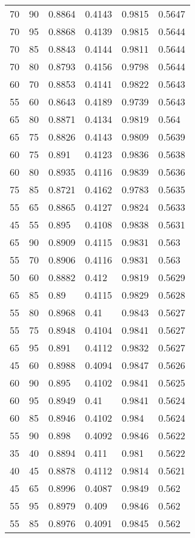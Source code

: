 \begin{center}
\begin{longtable}{|l|l|l|l|l|l|}
70 & 90 & 0.8864 & 0.4143 & 0.9815 & 0.5647 \\
70 & 95 & 0.8868 & 0.4139 & 0.9815 & 0.5644 \\
70 & 85 & 0.8843 & 0.4144 & 0.9811 & 0.5644 \\
70 & 80 & 0.8793 & 0.4156 & 0.9798 & 0.5644 \\
60 & 70 & 0.8853 & 0.4141 & 0.9822 & 0.5643 \\
55 & 60 & 0.8643 & 0.4189 & 0.9739 & 0.5643 \\
65 & 80 & 0.8871 & 0.4134 & 0.9819 & 0.564  \\
65 & 75 & 0.8826 & 0.4143 & 0.9809 & 0.5639 \\
60 & 75 & 0.891  & 0.4123 & 0.9836 & 0.5638 \\
60 & 80 & 0.8935 & 0.4116 & 0.9839 & 0.5636 \\
75 & 85 & 0.8721 & 0.4162 & 0.9783 & 0.5635 \\
55 & 65 & 0.8865 & 0.4127 & 0.9824 & 0.5633 \\
45 & 55 & 0.895  & 0.4108 & 0.9838 & 0.5631 \\
65 & 90 & 0.8909 & 0.4115 & 0.9831 & 0.563  \\
55 & 70 & 0.8906 & 0.4116 & 0.9831 & 0.563  \\
50 & 60 & 0.8882 & 0.412  & 0.9819 & 0.5629 \\
65 & 85 & 0.89   & 0.4115 & 0.9829 & 0.5628 \\
55 & 80 & 0.8968 & 0.41   & 0.9843 & 0.5627 \\
55 & 75 & 0.8948 & 0.4104 & 0.9841 & 0.5627 \\
65 & 95 & 0.891  & 0.4112 & 0.9832 & 0.5627 \\
45 & 60 & 0.8988 & 0.4094 & 0.9847 & 0.5626 \\
60 & 90 & 0.895  & 0.4102 & 0.9841 & 0.5625 \\
60 & 95 & 0.8949 & 0.41   & 0.9841 & 0.5624 \\
60 & 85 & 0.8946 & 0.4102 & 0.984  & 0.5624 \\
55 & 90 & 0.898  & 0.4092 & 0.9846 & 0.5622 \\
35 & 40 & 0.8894 & 0.411  & 0.981  & 0.5622 \\
40 & 45 & 0.8878 & 0.4112 & 0.9814 & 0.5621 \\
45 & 65 & 0.8996 & 0.4087 & 0.9849 & 0.562  \\
55 & 95 & 0.8979 & 0.409  & 0.9846 & 0.562  \\
55 & 85 & 0.8976 & 0.4091 & 0.9845 & 0.562  \\

\end{longtable}
\end{center}
